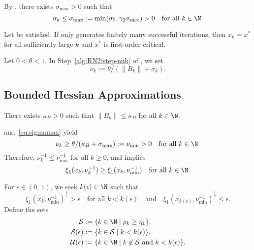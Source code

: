\documentclass[smallextended]{svjour3}       %
\begin{document}
By , there exists \(\sigma_{\max} > 0\) such that
\begin{equation}%
  \label{eq:sigmamax}
  \sigma_k \leq
  \sigma_{\max} := \min(\sigma_0, \gamma_2 \sigma_{\textup{succ}}) > 0
  \quad \text{for all } k \in \N.
\end{equation}

\begin{theorem}%
  \label{thm:lm-finite}
  Let  be satisfied.
  If  only generates finitely many successful iterations, then \(x_k = x^*\) for all sufficiently large
\(k\) and \(x^*\) is first-order critical.
\end{theorem}

Let \(0 < \theta < 1\).
In Step~\ref{alg:RN2:step-nuk} of , we set
\begin{equation}%
  \label{eq:nuk}
  \nu_k := \theta / (\|B_k\| + \sigma_k).
\end{equation}

\subsection{Bounded Hessian Approximations}%
\label{sec:B-bounded}

\begin{modelassumption}%
  \label{asm:B-bounded}
  There exists \(\kappa_B > 0\) such that \(\|B_k\| \leq \kappa_B\) for all \(k \in \N\).
\end{modelassumption}

 and~\eqref{eq:sigmamax} yield
\begin{equation}%
  \label{eq:numin}
  \nu_k \geq \theta / (\kappa_B + \sigma_{\max}) := \nu_{\min} > 0
  \quad \text{for all } k \in \N.
\end{equation}
Therefore, \(\nu_k^{-1} \leq \nu_{\min}^{-1}\) for all \(k \geq 0\), and \citep[Theorem~\(1.25\)]{rtrw} implies
\begin{equation}%
  \label{eq:ximin-nu}
  \xi_1(x_k, \nu_k^{-1}) \geq \xi_1(x_k, \nu_{\min}^{-1})
  \quad \text{for all } k \in \N.
\end{equation}

For \(\epsilon \in (0, \, 1)\), we seek \(k(\epsilon) \in \N\) such that
\begin{equation}
  \label{eq:RN2-stop}
  \xi_1{(x_k, \nu_{\min}^{-1})}^{\frac12} > \epsilon \quad \text{for all } k < k(\epsilon)
  \quad \text{and} \quad
  \xi_1{(x_{k(\epsilon)}, \nu_{\min}^{-1})}^{\frac12} \leq \epsilon.
\end{equation}
Define the sets
\begin{subequations}%
  \label{eq:S-U-sets}
  \begin{align}
       \mathcal{S} & := \{ k \in \N \mid \rho_k \geq \eta_1 \},
    \\ \mathcal{S}(\epsilon) & := \{ k \in \mathcal{S} \mid k < k(\epsilon) \},
    \\ \mathcal{U}(\epsilon) & := \{k \in \N \mid k \not \in \mathcal{S} \text{ and } k < k(\epsilon) \}.
  \end{align}
\end{subequations}
\end{document}
